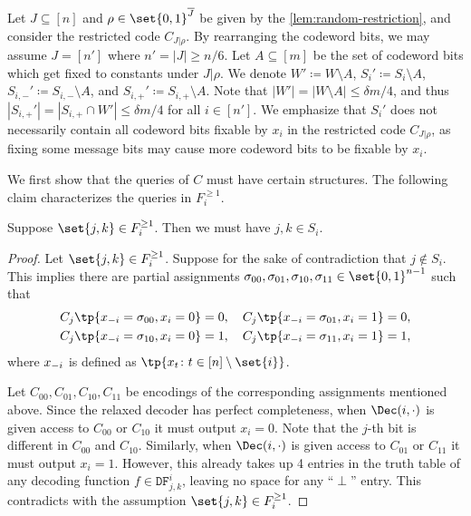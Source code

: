 Let $J \subseteq [n]$ and $\rho \in \set{0,1}^{\overline{J}}$ be given by the \cref{lem:random-restriction}, and consider the restricted code $C_{J|\rho}$. By rearranging the codeword bits, we may assume $J=[n']$ where $n'=|J| \ge n/6$. 
Let $A \subseteq [m]$ be the set of codeword bits which get fixed to constants under $J|\rho$. We denote $W'\coloneqq W\setminus A$, $S_i'\coloneqq S_i \setminus A$, $S_{i,-}'\coloneqq S_{i,-}\setminus A$, and $S_{i,+}'\coloneqq S_{i,+}\setminus A$. Note that $|W'|=|W\setminus A| \le \delta m/4$, and thus $|S_{i,+}'|=|S_{i,+}\cap W'|\le \delta m/4$ for all $i \in [n']$. We emphasize that $S_i'$ does not necessarily contain all codeword bits fixable by $x_i$ in the restricted code $C_{J|\rho}$, as fixing some message bits may cause more codeword bits to be fixable by $x_i$.

We first show that the queries of $C$ must have certain structures. The following claim characterizes the queries in $F_i^{\ge 1}$.
\begin{claim} \label{clm:bot-fix}
	Suppose $\set{j,k} \in F_{i}^{\ge 1}$. Then we must have $j,k \in S_i$.
\end{claim}
\begin{proof}
	Let $\set{j, k} \in F_{i}^{\ge 1}$. Suppose for the sake of contradiction that $j \notin S_i$. This implies there are partial assignments $\sigma_{00}, \sigma_{01}, \sigma_{10}, \sigma_{11} \in \set{0,1}^{n-1}$ such that 
	\begin{align*}
	C_j\tp{\*x_{-i} = \sigma_{00}, x_i = 0} = 0, \quad C_j\tp{\*x_{-i} = \sigma_{01}, x_i = 1} = 0, \\
	C_j\tp{\*x_{-i} = \sigma_{10}, x_i = 0} = 1, \quad C_j\tp{\*x_{-i} = \sigma_{11}, x_i = 1} = 1,
	\end{align*}
	where $\*x_{-i}$ is defined as $\tp{x_t \colon t \in [n]\setminus\set{i}}$.
	
	Let $C_{00}, C_{01}, C_{10}, C_{11}$ be encodings of the corresponding assignments mentioned above. Since the relaxed decoder has perfect completeness, when $\Dec(i,\cdot)$ is given access to $C_{00}$ or $C_{10}$  it must output $x_i=0$. Note that the $j$-th bit is different in $C_{00}$ and $C_{10}$. Similarly, when $\Dec(i,\cdot)$ is given access to $C_{01}$ or $C_{11}$ it must output $x_i = 1$. However, this already takes up 4 entries  in the truth table of any decoding function $f \in \mathtt{DF}_{j,k}^i$, leaving no space for any ``$\perp$'' entry. This contradicts with the assumption $\set{j,k} \in F_{i}^{\ge 1}$. 
\end{proof}

